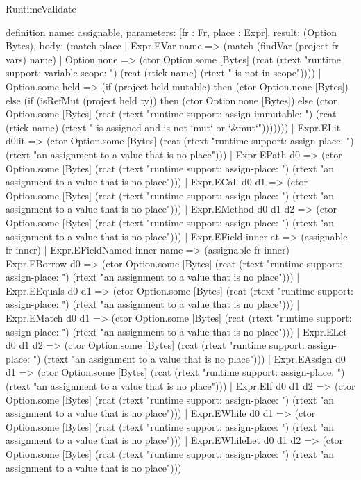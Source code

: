 \begin{lexlean}{RuntimeValidate}
\begin{semanticmodule}
definition{
  name: assignable,
  parameters: [fr : Fr, place : Expr],
  result: (Option Bytes),
  body: (match place
    | Expr.EVar name => (match (findVar (project fr vars) name)
      | Option.none => (ctor Option.some [Bytes] (rcat (rtext "runtime support: variable-scope: ") (rcat (rtick name) (rtext " is not in scope"))))
      | Option.some held => (if (project held mutable) then (ctor Option.none [Bytes]) else (if (isRefMut (project held ty)) then (ctor Option.none [Bytes]) else (ctor Option.some [Bytes] (rcat (rtext "runtime support: assign-immutable: ") (rcat (rtick name) (rtext " is assigned and is not `mut` or `&mut`")))))))
    | Expr.ELit d0lit => (ctor Option.some [Bytes] (rcat (rtext "runtime support: assign-place: ") (rtext "an assignment to a value that is no place")))
    | Expr.EPath d0 => (ctor Option.some [Bytes] (rcat (rtext "runtime support: assign-place: ") (rtext "an assignment to a value that is no place")))
    | Expr.ECall d0 d1 => (ctor Option.some [Bytes] (rcat (rtext "runtime support: assign-place: ") (rtext "an assignment to a value that is no place")))
    | Expr.EMethod d0 d1 d2 => (ctor Option.some [Bytes] (rcat (rtext "runtime support: assign-place: ") (rtext "an assignment to a value that is no place")))
    | Expr.EField inner at => (assignable fr inner)
    | Expr.EFieldNamed inner name => (assignable fr inner)
    | Expr.EBorrow d0 => (ctor Option.some [Bytes] (rcat (rtext "runtime support: assign-place: ") (rtext "an assignment to a value that is no place")))
    | Expr.EEquals d0 d1 => (ctor Option.some [Bytes] (rcat (rtext "runtime support: assign-place: ") (rtext "an assignment to a value that is no place")))
    | Expr.EMatch d0 d1 => (ctor Option.some [Bytes] (rcat (rtext "runtime support: assign-place: ") (rtext "an assignment to a value that is no place")))
    | Expr.ELet d0 d1 d2 => (ctor Option.some [Bytes] (rcat (rtext "runtime support: assign-place: ") (rtext "an assignment to a value that is no place")))
    | Expr.EAssign d0 d1 => (ctor Option.some [Bytes] (rcat (rtext "runtime support: assign-place: ") (rtext "an assignment to a value that is no place")))
    | Expr.EIf d0 d1 d2 => (ctor Option.some [Bytes] (rcat (rtext "runtime support: assign-place: ") (rtext "an assignment to a value that is no place")))
    | Expr.EWhile d0 d1 => (ctor Option.some [Bytes] (rcat (rtext "runtime support: assign-place: ") (rtext "an assignment to a value that is no place")))
    | Expr.EWhileLet d0 d1 d2 => (ctor Option.some [Bytes] (rcat (rtext "runtime support: assign-place: ") (rtext "an assignment to a value that is no place")))
}
\end{semanticmodule}
\end{lexlean}
